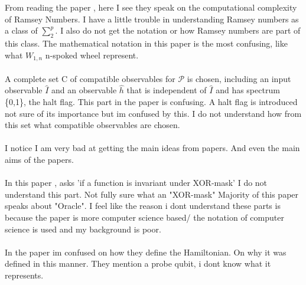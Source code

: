 \documentclass{Assignment}
\begin{document}
From reading the paper \cite{burr1981generalized}, here I see they speak on the computational complexity of Ramsey Numbers. 
I have a little trouble in understanding Ramsey numbers as a class of $\sum_{2}^{p}$. 
I also do not get the notation or how Ramsey numbers are part of this class.
The mathematical notation in this paper is the most confusing, like what $W_{1,n}$ n-spoked wheel represent.
\\
\\
\cite{Deutsch1989}
A complete set C of compatible observables for $\mathcal{P}$ is chosen, including an input 
observable $\hat{I}$ and an observable $\hat{h}$ that is independent of $\hat{I}$ and has spectrum \{0,1\}, the halt flag. 
This part in the paper is confusing.
A halt flag is introduced not sure of its importance but im confused by this.
I do not understand how from this set what compatible observables are chosen.
\\
\\
I notice I am very bad at getting the main ideas from papers.
And even the main aims of the papers.
\\
\\
In this paper \cite{doi:10.1137/S0097539796298637}, asks 'if a function is invariant under XOR-mask' I do not understand this part.
Not fully sure what an "XOR-mask"
Majority of this paper speaks about "Oracle".
I feel like the reason i dont understand these parts is because the paper is more computer science based/ the notation of computer science is used and my background is poor. 
\\\\
In the paper \cite{PhysRevA.93.032301} im confused on how they define the Hamiltonian. 
On why it was defined in this manner.
They mention a probe qubit, i dont know what it represents.
\end{document}
